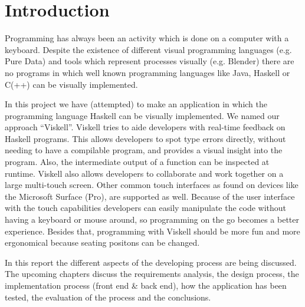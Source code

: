 \chapter{Introduction}

Programming has always been an activity which is done on a computer with a keyboard. Despite the existence of different visual programming languages (e.g. Pure Data) and tools which represent processes visually (e.g. Blender) there are no programs in which well known programming languages like Java, Haskell or C(++) can be visually implemented. 

In this project we have (attempted) to make an application in which the programming language Haskell can be visually implemented. We named our approach ``Viskell''. Viskell tries to aide developers with real-time feedback on Haskell programs. This allows developers to spot type errors directly, without needing to have a compilable program, and provides a visual insight into the program. Also, the intermediate output of a function can be inspected at runtime. Viskell also allows developers to collaborate and work together on a large multi-touch screen. Other common touch interfaces as found on devices like the Microsoft Surface (Pro), are supported as well. Because of the user interface with the touch capabilities developers can easily manipulate the code without having a keyboard or mouse around, so programming on the go becomes a better experience. Besides that,	 programming with Viskell should be more fun and more ergonomical because seating positons can be changed.

In this report the different aspects of the developing process are being discussed. The upcoming chapters discuss the requirements analysis, the design process, the implementation process (front end \& back end), how the application has been tested, the evaluation of the process and the conclusions. 